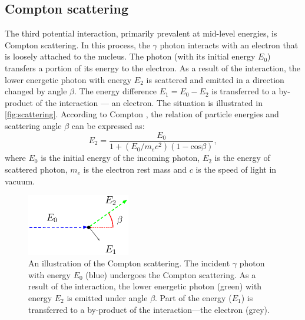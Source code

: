 \subsection{Compton scattering}
The third potential interaction, primarily prevalent at mid-level energies, is Compton scattering.
In this process, the $\gamma$ photon interacts with an electron that is loosely attached to the nucleus. 
The photon (with its initial energy $E_{0}$) transfers a portion of its energy to the electron.
As a result of the interaction, the lower energetic photon with energy $E_{2}$ is scattered and emitted in a direction changed by angle $\beta$. 
The energy difference $E_{1} = E_{0} - E_{2}$ is transferred to a by-product of the interaction --- an electron.
The situation is illustrated in \autoref{fig:scattering}.
According to Compton \cite{compton}, the relation of particle energies and scattering angle $\beta$ can be expressed as:
\begin{equation}
E_{2} = \frac{E_{0}}{  1 + (E_{0} / m_{e}c^{2}) (1 - \mathrm{cos} \beta)},
  \label{eq:compton_energies}
\end{equation}
where $E_{0}$ is the initial energy of the incoming photon, $E_{2}$ is the energy of scattered photon,  $m_{e}$ is the electron rest mass and $c$ is the speed of light in vacuum. 
\begin{figure}[!h]
    \centering
    \includegraphics[width=0.4\textwidth]{./fig/photos/compton_simple2.eps}
    \caption{An illustration of the Compton scattering. The incident $\gamma$ photon with energy $E_{0}$ (blue) undergoes the Compton scattering. As a result of the interaction, the lower energetic photon (green) with energy $E_{2}$ is emitted under angle $\beta$. Part of the energy ($E_{1}$) is transferred to a by-product of the interaction---the electron (grey).}
    \label{fig:scattering}
\end{figure}
